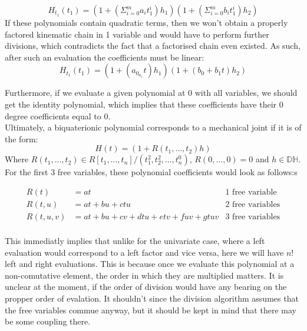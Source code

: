 \begin{equation}
    H_{t_1}(t_1) = (1+(\Sigma_{i=0}^{m}a_it^{i}_1)h_1)(1+ (\Sigma_{i=0}^{m}b_it^{i}_1)h_2)
\end{equation}
If these polynomials contain quadratic terms, then we won't obtain a properly factored kinematic chain in 1 variable and would have to perform further divisions, which contradicts the fact that a factorised chain even existed. As such, after such an evaluation the coefficients must be linear:
\begin{equation}
    H_{t_1}(t_1) = (1+(a_0_a_1t)h_1)(1+ (b_0+b_1t)h_2)
\end{equation}

Furthermore, if we evaluate a given polynomial at 0 with all variables, we should get the identity polynomial, which implies that these coefficients have their 0 degree coefficients equal to 0.\\
Ultimately, a biquaterionic polynomial corresponds to a mechanical joint if it is of the form:
\begin{equation}
    H(t) = (1+ R(t_1,\dots,t_2)h)
\end{equation}
Where $R(t_1,\dots,t_2) \in R[t_1,\dots,t_n] / (t_1^{2},t_2^{2},\dots,t_n^{0})$, $R(0,\dots,0) = 0 $ and $h \in \mathbb{DH}$.  For the first 3 free variables, these polynomial coefficients would look as follows:s

\begin{equation}
    \begin{aligned}
        R(t)&=at&\mbox{1 free variable}\\[1.25ex]
        R(t,u)&= at + bu + ctu&\mbox{2 free variables}\\[1.25ex]
        R(t,u,v)&= at +bu + cv + dtu +etv +fuv +gtuv &\mbox{3 free variables}\\[1.25ex]
    \end{aligned}
\end{equation}

This immediatly implies that unlike for the univariate case, where a left evaluation would correspond to a left factor and vice versa, here we will have $n!$ left and right evaluations.
This is because once we evaluate this polynomial at a non-comutative element, the order in which they are multiplied matters. 
It is unclear at the moment, if the order of division would have any bearing on the propper order of evalation. 
It shouldn't since the division algorithm assumes that the free variables commue anyway, but it should be kept in mind that there may be some coupling there.

